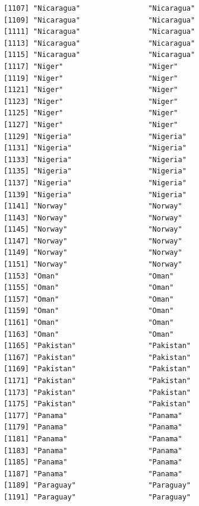 \documentclass[
  letterpaper,
  DIV=11,
  numbers=noendperiod]{scrreprt}
\begin{document}
\begin{verbatim}
[1107] "Nicaragua"                "Nicaragua"               
[1109] "Nicaragua"                "Nicaragua"               
[1111] "Nicaragua"                "Nicaragua"               
[1113] "Nicaragua"                "Nicaragua"               
[1115] "Nicaragua"                "Nicaragua"               
[1117] "Niger"                    "Niger"                   
[1119] "Niger"                    "Niger"                   
[1121] "Niger"                    "Niger"                   
[1123] "Niger"                    "Niger"                   
[1125] "Niger"                    "Niger"                   
[1127] "Niger"                    "Niger"                   
[1129] "Nigeria"                  "Nigeria"                 
[1131] "Nigeria"                  "Nigeria"                 
[1133] "Nigeria"                  "Nigeria"                 
[1135] "Nigeria"                  "Nigeria"                 
[1137] "Nigeria"                  "Nigeria"                 
[1139] "Nigeria"                  "Nigeria"                 
[1141] "Norway"                   "Norway"                  
[1143] "Norway"                   "Norway"                  
[1145] "Norway"                   "Norway"                  
[1147] "Norway"                   "Norway"                  
[1149] "Norway"                   "Norway"                  
[1151] "Norway"                   "Norway"                  
[1153] "Oman"                     "Oman"                    
[1155] "Oman"                     "Oman"                    
[1157] "Oman"                     "Oman"                    
[1159] "Oman"                     "Oman"                    
[1161] "Oman"                     "Oman"                    
[1163] "Oman"                     "Oman"                    
[1165] "Pakistan"                 "Pakistan"                
[1167] "Pakistan"                 "Pakistan"                
[1169] "Pakistan"                 "Pakistan"                
[1171] "Pakistan"                 "Pakistan"                
[1173] "Pakistan"                 "Pakistan"                
[1175] "Pakistan"                 "Pakistan"                
[1177] "Panama"                   "Panama"                  
[1179] "Panama"                   "Panama"                  
[1181] "Panama"                   "Panama"                  
[1183] "Panama"                   "Panama"                  
[1185] "Panama"                   "Panama"                  
[1187] "Panama"                   "Panama"                  
[1189] "Paraguay"                 "Paraguay"                
[1191] "Paraguay"                 "Paraguay"                

\end{verbatim}
\end{document}
